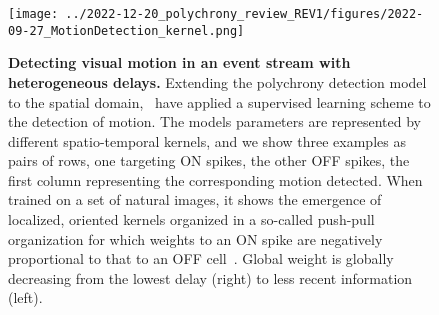 \documentclass[brainsci, %
               review,submit,pdftex,moreauthors
               ]{Definitions/mdpi}
\begin{document}
\begin{figure}[H]%
  \centering
  \texttt{[image: ../2022-12-20\_polychrony\_review\_REV1/figures/2022-09-27\_MotionDetection\_kernel.png]}
    \caption{\textbf{Detecting visual motion in an event stream with heterogeneous delays.} Extending the polychrony detection model to the spatial domain,~\citet{grimaldi_learning_2022} have applied a supervised learning scheme to the detection of motion. The models parameters are represented by different spatio-temporal kernels, and we show three examples as pairs of rows, one targeting ON spikes, the other OFF spikes, the first column representing the corresponding motion detected. When trained on a set of natural images, it shows the emergence of localized, oriented kernels organized in a so-called push-pull organization for which weights to an ON spike are negatively proportional to that to an OFF cell~\citep{kremkow_push-pull_2016}. Global weight is globally decreasing from the lowest delay (right) to less recent information (left).
     }
  \label{fig:icip}
\end{figure}
% 
\end{document}
